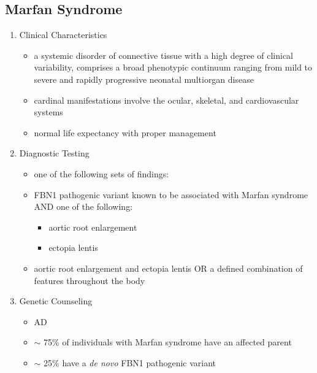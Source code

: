 \documentclass[12pt]{scrartcl}
\begin{document}
\subsection{Marfan Syndrome}
\label{sec:org7e9be86}
\begin{enumerate}
\item Clinical Characteristics
\label{sec:orgae05878}
\begin{itemize}
\item a systemic disorder of connective tissue with a high degree of
clinical variability, comprises a broad phenotypic continuum ranging
from mild to severe and rapidly progressive neonatal multiorgan
disease
\item cardinal manifestations involve the ocular, skeletal, and
cardiovascular systems
\item normal life expectancy with proper management
\end{itemize}
\item Diagnostic Testing
\label{sec:orgcc4dc4a}
\begin{itemize}
\item one of the following sets of findings:

\item FBN1 pathogenic variant known to be associated with Marfan syndrome
AND one of the following:
\begin{itemize}
\item aortic root enlargement
\item ectopia lentis
\end{itemize}
\item aortic root enlargement and ectopia lentis OR a
defined combination of features throughout the body
\end{itemize}

\item Genetic Counseling
\label{sec:org2eeb615}
\begin{itemize}
\item AD
\item \(\sim\) 75\% of individuals with Marfan syndrome have an affected
parent
\item \(\sim\) 25\% have a \emph{de novo} FBN1 pathogenic variant
\end{itemize}
\end{enumerate}
\end{document}
